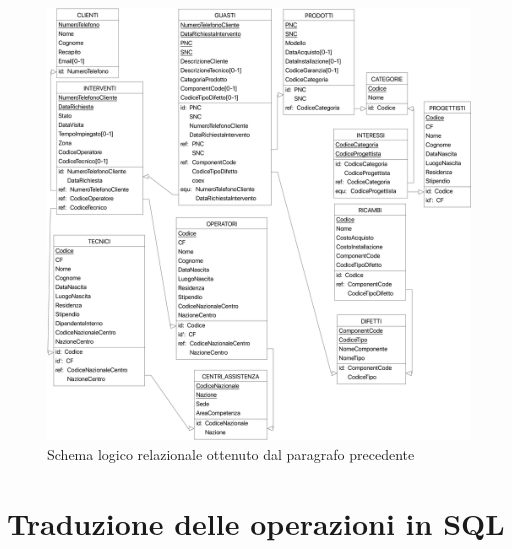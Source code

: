 \documentclass[a4paper, 12pt]{report}
\begin{document}
\begin{figure}[H]
	\centering
	\includegraphics[width=\linewidth]{images/logic.png}
	\caption{Schema logico relazionale ottenuto dal paragrafo precedente}
\end{figure}

\newpage

\section{Traduzione delle operazioni in SQL}
\end{document}

